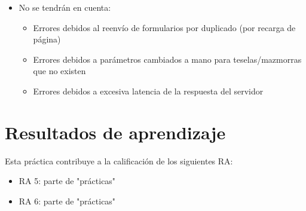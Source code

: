 \documentclass[a4paper]{article}
\begin{document}
\begin{itemize}
\begin{itemize}
\end{itemize}
\item No se tendrán en cuenta:
\begin{itemize}
\item Errores debidos al reenvío de formularios por duplicado (por recarga de página)
\item Errores debidos a parámetros cambiados a mano para teselas/mazmorras que no existen
\item Errores debidos a excesiva latencia de la respuesta del servidor
\end{itemize}
\end{itemize}

\section*{Resultados de aprendizaje}
\label{sec:org0000012}
Esta práctica contribuye a la calificación de los siguientes RA:
\begin{itemize}
\item RA 5: parte de "prácticas"
\item RA 6: parte de "prácticas"
\end{itemize}
\end{document}
